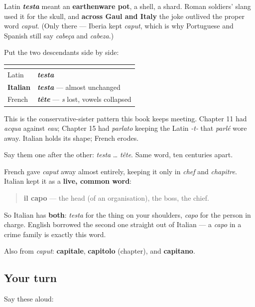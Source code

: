 \begin{cousinweb}
Latin \emph{\textbf{testa}} meant an \textbf{earthenware pot}, a shell, a shard. Roman soldiers' slang used it for the skull, and \textbf{across Gaul and Italy} the joke outlived the proper word \emph{caput}. (Only there — Iberia kept \emph{caput}, which is why Portuguese and Spanish still say \emph{cabeça} and \emph{cabeza}.)

Put the two descendants side by side:

\noindent
\begin{tabularx}{\linewidth}{@{}>{\raggedright\arraybackslash}X>{\raggedright\arraybackslash}X@{}}
\toprule
\textbf{} & \textbf{} \\
\midrule
Latin & \emph{\textbf{testa}} \\
\textbf{Italian} & \emph{\textbf{testa}} — almost unchanged \\
French & \emph{\textbf{tête}} — \emph{s} lost, vowels collapsed \\
\bottomrule
\end{tabularx}

This is the conservative-sister pattern this book keeps meeting. Chapter 11 had \emph{acqua} against \emph{eau}; Chapter 15 had \emph{parlato} keeping the Latin \emph{-t-} that \emph{parlé} wore away. Italian holds its shape; French erodes.

Say them one after the other: \emph{testa} … \emph{tête}. Same word, ten centuries apart.
\end{cousinweb}

\begin{cousinweb}
French gave \emph{caput} away almost entirely, keeping it only in \emph{chef} and \emph{chapitre}. Italian kept it as a \textbf{live, common word}:

\begin{quote}
\textbf{il capo} — the head (of an organisation), the boss, the chief.
\end{quote}

So Italian has \textbf{both}: \emph{testa} for the thing on your shoulders, \emph{capo} for the person in charge. English borrowed the second one straight out of Italian — a \emph{capo} in a crime family is exactly this word.

Also from \emph{caput}: \textbf{capitale}, \textbf{capitolo} (chapter), and \textbf{capitano}.
\end{cousinweb}

\subsection*{Your turn}
Say these aloud:

